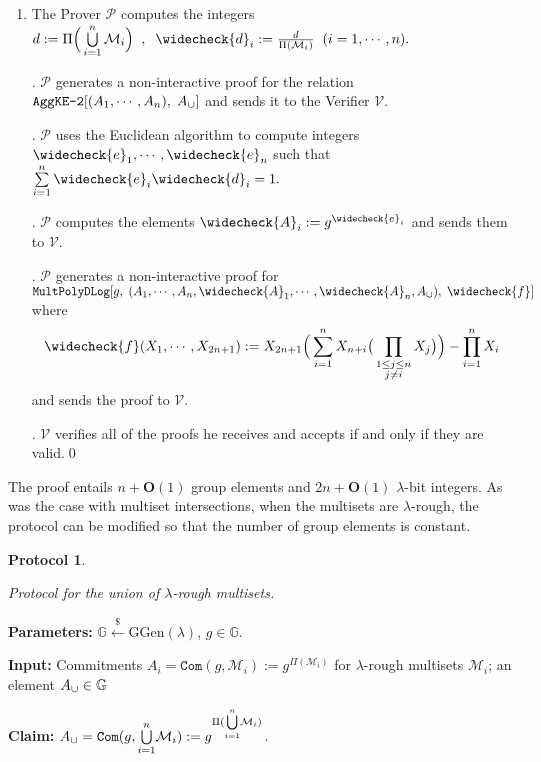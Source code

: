 \documentclass[11pt, lettersize, notitlepage, leqno, footskip=0.6cm]{article}
\newcommand{\pl}{\prod\limits}
\newcommand{\slim}{\sum\limits}
\newcommand{\ttt}{\texttt}
\newcommand{\mc}{\mathcal}
\newcommand{\mb}{\mathbb}
\newcommand{\mbf}{\mathbf}
\newcommand{\mr}{\mathrm}
\newcommand{\lam}{\lambda}
\newcommand{\lamb}{\lambda}
\newcommand{\weck}{\widecheck}
\newcommand{\bO}{\mbf{O}}
\newcommand{\mP}{\mc{P}}
\newcommand{\V}{\mc{V}}
\newcommand{\mcM}{\mc{M}}
\newcommand{\vs}{\vspace{-0.15cm}}
\newcommand{\noin}{\noindent}
\newtheorem{Prot}[Thm]{Protocol}
\numberwithin{equation}{section}
\begin{document}
\begin{enumerate}[wide, labelwidth=!, labelindent=0pt]\vs \item The Prover $\mP$ computes the integers $d:= \Pi\Big(\bigcup\limits_{i=1}^n \mc{M}_i\Big)\;\;,\;\;\weck{d}_i:= \frac{d}{\Pi(\mcM_i)}\;\;(i=1,\cdots,n).$

\noin 2. $\mP$ generates a non-interactive proof for the relation $\ttt{AggKE-2}[(A_1,\cdots,A_n),\;A_{\tt{\cup}}]$ and sends it to the Verifier $\V$. 

\noin 3. $\mP$ uses the Euclidean algorithm to compute integers $\weck{e}_1,\cdots, \weck{e}_n$ such that $\slim_{i=1}^n \weck{e}_i\weck{d}_i = 1.$ \vs

\noin 4. $\mP$ computes the elements $\weck{A}_i:= g^{\weck{e}_i}$ and sends them to $\V$.

\noin 5. $\mP$ generates a non-interactive proof for $\ttt{MultPolyDLog}[g,\;(A_1,\cdots,A_n,\weck{A}_1,\cdots,\weck{A}_n,A_{\tt{\cup}}),\; \weck{f}]$ where \vs $$\weck{f}(X_1,\cdots,X_{2n+1}):= X_{2n+1}\Big(\slim_{i=1}^n X_{n+i}\big(\pl_{\substack{1\leq j\leq n\\ j\neq i}} X_{j}\big)\Big) - \pl_{i=1}^n X_i$$ and sends the proof to $\V$.

\noin 6. $\V$ verifies all of the proofs he receives and accepts if and only if they are valid.\qed \end{enumerate}


\noin The proof entails $n+\bO(1)$ group elements and $2n+\bO(1)$ $\lam$-bit integers. As was the case with multiset intersections, when the multisets are $\lam$-rough, the protocol can be modified so that the number of group elements is constant.

\vspace{0.1cm}

\begin{Prot} \hypertarget{Uni}{Protocol for the union of $\lam$-rough multisets.}\end{Prot} \vspace{-0.3cm}

\noin \textbf{Parameters:} $\mb{G}\xleftarrow{\$} \mr{GGen}(\lamb)$,\; $g\in \mb{G}$.

\noin \textbf{Input:} Commitments $A_i = \ttt{Com}(g, \mc{M}_i) := g^{\Pi(\mc{M}_i)}$ for $\lam$-rough multisets $\mc{M}_i$; an element $A_{\tt{\cup}}\in\mb{G}$

\noin \textbf{Claim:} $A_{\tt{\cup}} = \protect{\verb|Com|}(g, {\bigcup\limits_{i=1}^n} \mc{M}_i) := g^{\Pi({\bigcup\limits_{i=1}^n} \mc{M}_i)}$.
\end{document}
